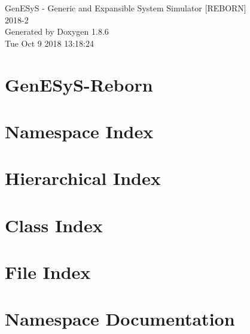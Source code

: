 \documentclass[twoside]{book}
\newcommand{\clearemptydoublepage}{%
  \newpage{\pagestyle{empty}\cleardoublepage}%
}
\begin{document}
\hypersetup{pageanchor=false}
\begin{titlepage}
\vspace*{7cm}
\begin{center}%
{\Large Gen\-E\-Sy\-S -\/ Generic and Expansible System Simulator \mbox{[}R\-E\-B\-O\-R\-N\mbox{]} \\[1ex]\large 2018-\/2 }\\
\vspace*{1cm}
{\large Generated by Doxygen 1.8.6}\\
\vspace*{0.5cm}
{\small Tue Oct 9 2018 13:18:24}\\
\end{center}
\end{titlepage}
\clearemptydoublepage
\tableofcontents
\clearemptydoublepage
{}
\hypersetup{pageanchor=true}

\chapter{Gen\-E\-Sy\-S-\/\-Reborn}
\label{md__r_e_a_d_m_e}
\hypertarget{md__r_e_a_d_m_e}{}

\chapter{Namespace Index}

\chapter{Hierarchical Index}

\chapter{Class Index}

\chapter{File Index}

\chapter{Namespace Documentation}

\end{document}
